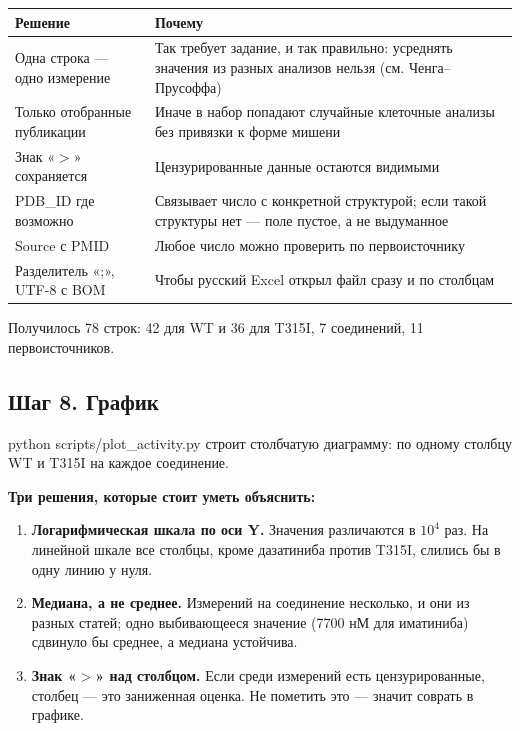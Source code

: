 \documentclass[11pt,a4paper]{article}
\newcommand{\code}[1]{{\ttfamily #1}}
\begin{document}
\begin{center}
\small
\begin{tabular}{L{4.2cm}L{10.4cm}}
\toprule
\textbf{Решение} & \textbf{Почему} \\
\midrule
Одна строка --- одно измерение & Так требует задание, и так правильно: усреднять значения из разных анализов нельзя (см. Ченга--Прусоффа) \\
Только отобранные публикации & Иначе в набор попадают случайные клеточные анализы без привязки к форме мишени \\
Знак «$>$» сохраняется & Цензурированные данные остаются видимыми \\
\code{PDB\_ID} где возможно & Связывает число с конкретной структурой; если такой структуры нет --- поле пустое, а не выдуманное \\
\code{Source} с PMID & Любое число можно проверить по первоисточнику \\
Разделитель «;», UTF-8 с BOM & Чтобы русский Excel открыл файл сразу и по столбцам \\
\bottomrule
\end{tabular}
\end{center}

Получилось 78 строк: 42 для WT и 36 для T315I, 7 соединений, 11 первоисточников.

\subsection{Шаг 8. График}

\code{python scripts/plot\_activity.py} строит столбчатую диаграмму: по одному
столбцу WT и T315I на каждое соединение.

\textbf{Три решения, которые стоит уметь объяснить:}
\begin{enumerate}[leftmargin=*,topsep=2pt,itemsep=2pt]
\item \textbf{Логарифмическая шкала по оси Y.} Значения различаются в $10^4$ раз.
На линейной шкале все столбцы, кроме дазатиниба против T315I, слились бы в одну
линию у нуля.
\item \textbf{Медиана, а не среднее.} Измерений на соединение несколько, и они
из разных статей; одно выбивающееся значение (7700 нМ для иматиниба) сдвинуло бы
среднее, а медиана устойчива.
\item \textbf{Знак «$>$» над столбцом.} Если среди измерений есть цензурированные,
столбец --- это заниженная оценка. Не пометить это --- значит соврать в графике.
\end{enumerate}
\end{document}
